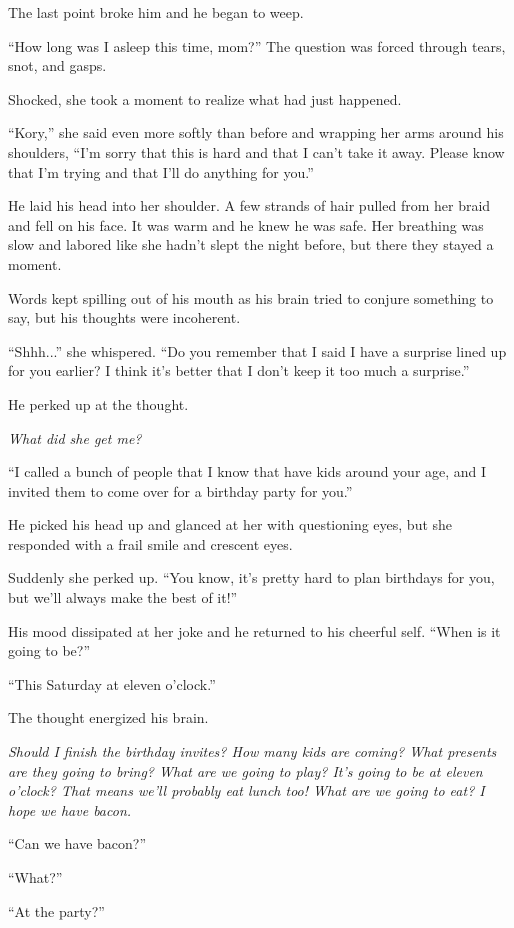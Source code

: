 \documentclass[9pt]{memoir}
\begin{document}
The last point broke him and he began to weep.

``How long was I asleep this time, mom?'' The question was forced through tears, snot, and gasps.

Shocked, she took a moment to realize what had just happened.

``Kory,'' she said even more softly than before and wrapping her arms around his shoulders, ``I'm sorry that this is hard and that I can't take it away. Please know that I'm trying and that I'll do anything for you.''

He laid his head into her shoulder. A few strands of hair pulled from her braid and fell on his face. It was warm and he knew he was safe. Her breathing was slow and labored like she hadn't slept the night before, but there they stayed a moment.

Words kept spilling out of his mouth as his brain tried to conjure something to say, but his thoughts were incoherent.

``Shhh...'' she whispered. ``Do you remember that I said I have a surprise lined up for you earlier? I think it's better that I don't keep it too much a surprise.''

He perked up at the thought.

\textit{What did she get me?}

``I called a bunch of people that I know that have kids around your age, and I invited them to come over for a birthday party for you.''

He picked his head up and glanced at her with questioning eyes, but she responded with a frail smile and crescent eyes.

Suddenly she perked up. ``You know, it's pretty hard to plan birthdays for you, but we'll always make the best of it!''

His mood dissipated at her joke and he returned to his cheerful self. ``When is it going to be?''

``This Saturday at eleven o'clock.''

The thought energized his brain.

\textit{Should I finish the birthday invites? How many kids are coming? What presents are they going to bring? What are we going to play? It's going to be at eleven o'clock? That means we'll probably eat lunch too! What are we going to eat? I hope we have bacon.}

``Can we have bacon?''

``What?''

``At the party?''
\end{document}
